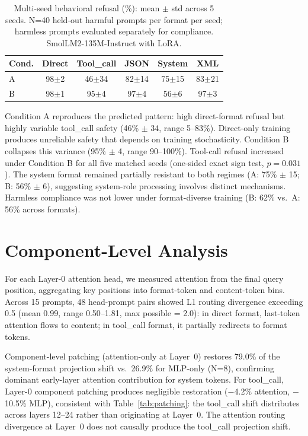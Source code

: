 \documentclass[conference]{IEEEtran}
\begin{document}
\begin{table}[t]
\caption{Multi-seed behavioral refusal (\%): mean $\pm$ std across 5 seeds. N=40 held-out harmful prompts per format per seed; harmless prompts evaluated separately for compliance. SmolLM2-135M-Instruct with LoRA.}
\label{tab:synthetic}
\centering
\small
\begin{tabular}{lccccc}
\toprule
Cond. & Direct & Tool\_call & JSON & System & XML \\
\midrule
A & 98$\pm$2 & 46$\pm$34 & 82$\pm$14 & 75$\pm$15 & 83$\pm$21 \\
B & 98$\pm$1 & 95$\pm$4 & 97$\pm$4 & 56$\pm$6 & 97$\pm$3 \\
\bottomrule
\end{tabular}
\end{table}

Condition A reproduces the predicted pattern: high direct-format refusal but highly variable tool\_call safety (46\% $\pm$ 34, range 5--83\%). Direct-only training produces unreliable safety that depends on training stochasticity. Condition B collapses this variance (95\% $\pm$ 4, range 90--100\%). Tool-call refusal increased under Condition B for all five matched seeds (one-sided exact sign test, $p = 0.031$). The system format remained partially resistant to both regimes (A: 75\% $\pm$ 15; B: 56\% $\pm$ 6), suggesting system-role processing involves distinct mechanisms. Harmless compliance was not lower under format-diverse training (B: 62\% vs.\ A: 56\% across formats).

\section{Component-Level Analysis}
\label{sec:pathway}

For each Layer-0 attention head, we measured attention from the final query position, aggregating key positions into format-token and content-token bins. Across 15 prompts, 48 head-prompt pairs showed L1 routing divergence exceeding 0.5 (mean 0.99, range 0.50--1.81, max possible = 2.0): in direct format, last-token attention flows to content; in tool\_call format, it partially redirects to format tokens.

Component-level patching (attention-only at Layer~0) restores 79.0\% of the system-format projection shift vs.\ 26.9\% for MLP-only (N=8), confirming dominant early-layer attention contribution for system tokens. For tool\_call, Layer-0 component patching produces negligible restoration ($-$4.2\% attention, $-$10.5\% MLP), consistent with Table~\ref{tab:patching}: the tool\_call shift distributes across layers 12--24 rather than originating at Layer~0. The attention routing divergence at Layer~0 does not causally produce the tool\_call projection shift.
\end{document}

